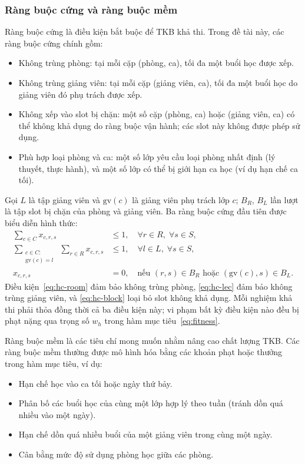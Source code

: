 \documentclass[a4paper,12pt,oneside]{article}
\begin{document}
	\subsubsection{Ràng buộc cứng và ràng buộc mềm}
	
	Ràng buộc cứng là điều kiện bắt buộc để TKB khả thi. Trong đề tài này, các ràng buộc cứng chính gồm:
	\begin{itemize}
		\item Không trùng phòng: tại mỗi cặp (phòng, ca), tối đa một buổi học được xếp.
		\item Không trùng giảng viên: tại mỗi cặp (giảng viên, ca), tối đa một buổi học do giảng viên đó phụ trách được xếp.
		\item Không xếp vào slot bị chặn: một số cặp (phòng, ca) hoặc (giảng viên, ca) có thể không khả dụng do ràng buộc vận hành; các slot này không được phép sử dụng.
		\item Phù hợp loại phòng và ca: một số lớp yêu cầu loại phòng nhất định (lý thuyết, thực hành), và một số lớp có thể bị giới hạn ca học (ví dụ hạn chế ca tối).
	\end{itemize}
	
	Gọi $L$ là tập giảng viên và $\mathrm{gv}(c)$ là giảng viên phụ trách lớp $c$; $B_R$, $B_L$ lần lượt là tập slot bị chặn của phòng và giảng viên. Ba ràng buộc cứng đầu tiên được biểu diễn hình thức:
	\begin{align}
		\sum_{c \in C} x_{c,r,s} &\leq 1,
		\quad \forall r \in R,\; \forall s \in S, \label{eq:hc-room} \\
		\sum_{\substack{c \in C:\\\mathrm{gv}(c)=l}}\;\sum_{r \in R} x_{c,r,s} &\leq 1,
		\quad \forall l \in L,\; \forall s \in S, \label{eq:hc-lec} \\
		x_{c,r,s} &= 0,
		\quad \text{nếu } (r,s)\in B_R \text{ hoặc } (\mathrm{gv}(c),s)\in B_L. \label{eq:hc-block}
	\end{align}
	Điều kiện~\eqref{eq:hc-room} đảm bảo không trùng phòng, \eqref{eq:hc-lec} đảm bảo không trùng giảng viên, và \eqref{eq:hc-block} loại bỏ slot không khả dụng. Mỗi nghiệm khả thi phải thỏa đồng thời cả ba điều kiện này; vi phạm bất kỳ điều kiện nào đều bị phạt nặng qua trọng số $w_h$ trong hàm mục tiêu~\eqref{eq:fitness}.

	Ràng buộc mềm là các tiêu chí mong muốn nhằm nâng cao chất lượng TKB. Các ràng buộc mềm thường được mô hình hóa bằng các khoản phạt hoặc thưởng trong hàm mục tiêu, ví dụ:
	\begin{itemize}
		\item Hạn chế học vào ca tối hoặc ngày thứ bảy.
		\item Phân bố các buổi học của cùng một lớp hợp lý theo tuần (tránh dồn quá nhiều vào một ngày).
		\item Hạn chế dồn quá nhiều buổi của một giảng viên trong cùng một ngày.
		\item Cân bằng mức độ sử dụng phòng học giữa các phòng.
	\end{itemize}
	
\end{document}
